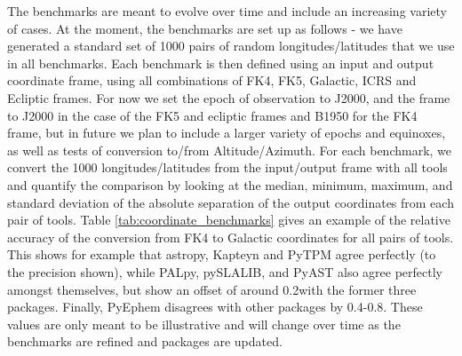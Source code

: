 \documentclass[modern]{aastex61}
\begin{document}
The benchmarks are meant to evolve over time and include an increasing variety of cases. At the moment, the benchmarks are set up as follows - we have generated a standard set of 1000 pairs of random longitudes/latitudes that we use in all benchmarks. Each benchmark is then defined using an input and output coordinate frame, using all combinations of FK4, FK5, Galactic, ICRS and Ecliptic frames. For now we set the epoch of observation to J2000, and the frame to J2000 in the case of the FK5 and ecliptic frames and B1950 for the FK4 frame, but in future we plan to include a larger variety of epochs and equinoxes, as well as tests of conversion to/from Altitude/Azimuth. For each benchmark, we convert the 1000 longitudes/latitudes from the input/output frame with all tools and quantify the comparison by looking at the median, minimum, maximum, and standard deviation of the absolute separation of the output coordinates from each pair of tools. Table \ref{tab:coordinate_benchmarks} gives an example of the relative accuracy of the conversion from FK4 to Galactic coordinates for all pairs of tools. This shows for example that astropy, Kapteyn and PyTPM agree perfectly (to the precision shown), while PALpy, pySLALIB, and PyAST also agree perfectly amongst themselves, but show an offset of around 0.2\arcsec with the former three packages. Finally, PyEphem disagrees with other packages by 0.4-0.8\arcsec. These values are only meant to be illustrative and will change over time as the benchmarks are refined and packages are updated.
\end{document}
